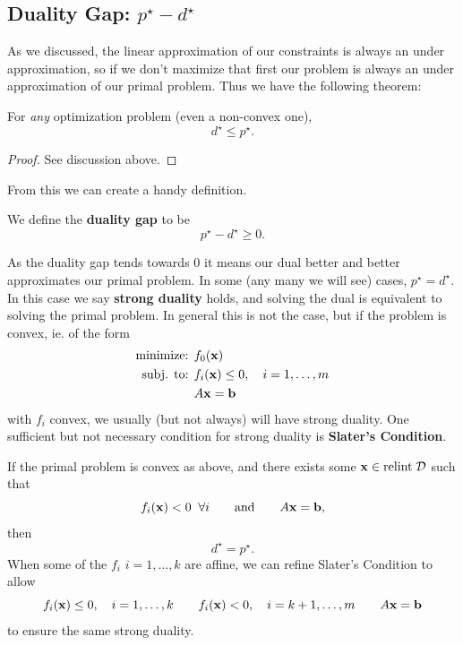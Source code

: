 \documentclass{article}
\begin{document}
\subsection{Duality Gap: $p^\star - d^\star$}

As we discussed, the linear approximation of our constraints is always an under approximation,
so if we don't maximize that first our problem is always an under approximation of our primal
problem. Thus we have the following theorem:

\begin{theorem}
    For \textit{any} optimization problem (even a non-convex one),
    \[
        d^\star \leq p^\star.
    \]
\end{theorem}
\begin{proof}
    See discussion above.
\end{proof}

From this we can create a handy definition.
\begin{definition}
    We define the \textbf{duality gap} to be
    \[
        p^\star - d^\star \geq 0.
    \]
\end{definition}
As the duality gap tends towards $0$ it means our dual better and better approximates
our primal problem. In some (any many we will see) cases, $p^\star = d^\star$. In this
case we say \textbf{strong duality} holds, and solving the dual is equivalent to solving
the primal problem. In general this is not the case, but if the problem is convex,
ie. of the form
\begin{align*}
    \text{minimize: } & f_0({\bf x})\\
    \text{subj. to: } & f_i({\bf x}) \leq 0, \quad i=1,\dots,m\\
                      & A{\bf x} = {\bf b}
\end{align*}
with $f_i$ convex, we usually (but not always) will have strong duality. One sufficient
but not necessary condition for strong duality is \textbf{Slater's Condition}.

\begin{theorem}
    If the primal problem is convex as above, and there exists some ${\bf x}\in \mathrm{relint} \;{\cal D}$
    such that
    \[
        f_i({\bf x}) < 0 \;\; \forall i \qquad \text{and} \qquad A{\bf x}={\bf b},
    \]
    then
    \[
        d^\star = p^\star.
    \]
    When some of the $f_i$ $i=1,\dots,k$ are affine, we can refine Slater's Condition
    to allow
    \[
        f_i({\bf x}) \leq 0, \quad i=1,\dots,k \qquad f_i({\bf x})<0,\quad i=k+1,\dots,m \qquad A{\bf x}={\bf b}
    \]
    to ensure the same strong duality.
\end{theorem}
\end{document}
